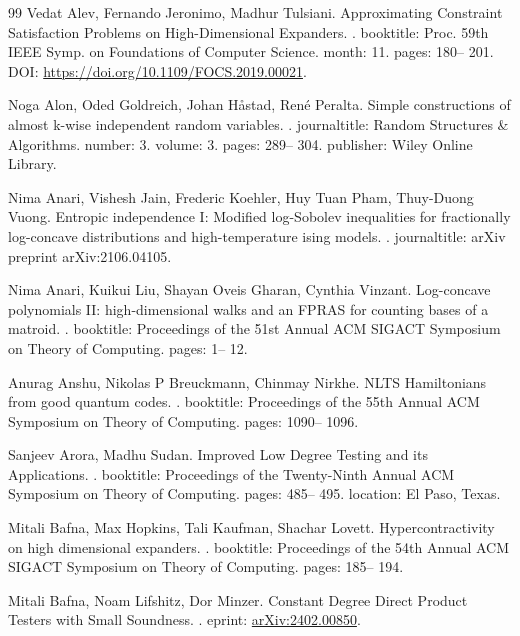 \begin{thebibliography}{99}
Vedat Alev, Fernando Jeronimo, Madhur Tulsiani.
\newblock Approximating Constraint Satisfaction Problems on High-Dimensional Expanders.
.
\newblock booktitle: Proc. 59th IEEE Symp. on Foundations of Computer Science.
\newblock month: 11.
\newblock pages: 180-- 201.
\newblock DOI: \url{https://doi.org/10.1109/FOCS.2019.00021}.

Noga Alon, Oded Goldreich, Johan H{å}stad, René Peralta.
\newblock Simple constructions of almost k-wise independent random variables.
.
\newblock journaltitle: Random Structures \& Algorithms.
\newblock number: 3.
\newblock volume: 3.
\newblock pages: 289-- 304.
\newblock publisher: Wiley Online Library.

Nima Anari, Vishesh Jain, Frederic Koehler, Huy Tuan Pham, Thuy-Duong Vuong.
\newblock Entropic independence I: Modified log-Sobolev inequalities for fractionally log-concave distributions and high-temperature ising models.
.
\newblock journaltitle: arXiv preprint arXiv:2106.04105.

Nima Anari, Kuikui Liu, Shayan Oveis Gharan, Cynthia Vinzant.
\newblock Log-concave polynomials II: high-dimensional walks and an FPRAS for counting bases of a matroid.
.
\newblock booktitle: Proceedings of the 51st Annual ACM SIGACT Symposium on Theory of Computing.
\newblock pages: 1-- 12.

Anurag Anshu, Nikolas P Breuckmann, Chinmay Nirkhe.
\newblock NLTS Hamiltonians from good quantum codes.
.
\newblock booktitle: Proceedings of the 55th Annual ACM Symposium on Theory of Computing.
\newblock pages: 1090-- 1096.

Sanjeev Arora, Madhu Sudan.
\newblock Improved Low Degree Testing and its Applications.
.
\newblock booktitle: Proceedings of the Twenty-Ninth Annual {ACM} Symposium on Theory of Computing.
\newblock pages: 485-- 495.
\newblock location: El Paso, Texas.

Mitali Bafna, Max Hopkins, Tali Kaufman, Shachar Lovett.
\newblock Hypercontractivity on high dimensional expanders.
.
\newblock booktitle: Proceedings of the 54th Annual ACM SIGACT Symposium on Theory of Computing.
\newblock pages: 185-- 194.

Mitali Bafna, Noam Lifshitz, Dor Minzer.
\newblock Constant Degree Direct Product Testers with Small Soundness.
.
\newblock eprint: \url{arXiv:2402.00850}.


\end{thebibliography}
